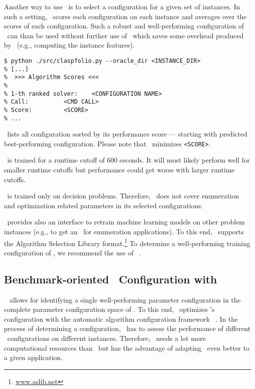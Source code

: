 Another way to use \claspfolio\ is to select a configuration for a given set of instances.
In such a setting, \claspfolio\ scores each configuration on each instance 
and averages over the scores of each configuration.
Such a robust and well-performing configuration of \clasp\ can than be used without further use of \claspfolio\
which saves some overhead produced by \claspfolio\ (e.g., computing the instance features).

\begin{lstlisting}[numbers=none]
$ python ./src/claspfolio.py --oracle_dir <INSTANCE_DIR>
% [...]
%  >>> Algorithm Scores <<<
% 
% 1-th ranked solver: 	 <CONFIGURATION NAME>
% Call: 		 <CMD CALL>
% Score: 		 <SCORE>
% ...
\end{lstlisting}
%
\claspfolio\ lists all configuration sorted by its performance score --- starting with predicted best-performing configuration.
Please note that \claspfolio\ minimizes \texttt{<SCORE>}.

\begin{note}
\claspfolio\ is trained for a runtime cutoff of $600$ seconds. 
It will most likely perform well for smaller runtime cutoffs 
but performance could get worse with larger runtime cutoffs.
\end{note}

\begin{note}
\claspfolio\ is trained only on decision problems.
Therefore, \claspfolio\ does not cover enumeration and optimization related parameters in its selected configurations.
\end{note}

\claspfolio\ provides also an interface to retrain machine learning models on other problem instances 
(e.g., to get an \claspfolio\ for enumeration applications).
To this end, \claspfolio\ supports the Algorithm Selection Library format.\footnote{\url{www.aslib.net}}
To determine a well-performing training configuration of \claspfolio,
we recommend the use of \sysfont{autofolio}~\cite{lihohusc15a}.%

\subsection{Benchmark-oriented \clasp\ Configuration with \piclasp}
\label{sec:piclasp}

\piclasp\ %
allows for identifying a single well-performing parameter configuration 
in the complete parameter configuration space of \clasp.
To this end, \piclasp\ optimizes \clasp's configuration with the automatic algorithm configuration framework \smac~\cite{huhole11b}.
In the process of determining a configuration,
\piclasp\ has to assess the performance of different \clasp\ configurations on different instances. 
Therefore, \piclasp\ needs a lot more computational resources than \claspfolio\
but has the advantage of adapting \clasp\ even better to a given application.
 
